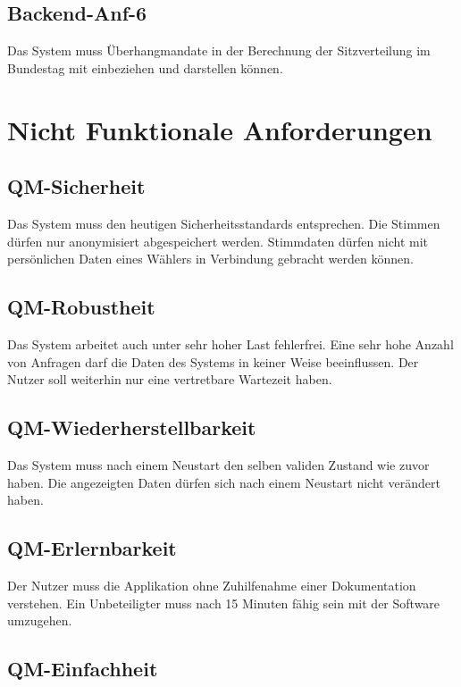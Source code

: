 \documentclass[a4paper]{scrreprt}
\begin{document}
\subsection{Backend-Anf-6}

Das System muss Überhangmandate in der Berechnung der Sitzverteilung im Bundestag mit einbeziehen und darstellen können.

\section{Nicht Funktionale Anforderungen}

\subsection{QM-Sicherheit}

Das System muss den heutigen Sicherheitsstandards entsprechen. Die Stimmen dürfen nur anonymisiert abgespeichert werden. Stimmdaten dürfen nicht mit persönlichen Daten eines Wählers in Verbindung gebracht werden können.

\subsection{QM-Robustheit}

Das System arbeitet auch unter sehr hoher Last fehlerfrei. Eine sehr hohe Anzahl von Anfragen darf die Daten des Systems in keiner Weise beeinflussen. Der Nutzer soll weiterhin nur eine vertretbare Wartezeit haben.

\subsection{QM-Wiederherstellbarkeit}

Das System muss nach einem Neustart den selben validen Zustand wie zuvor haben. Die angezeigten Daten dürfen sich nach einem Neustart nicht verändert haben.

\subsection{QM-Erlernbarkeit}

Der Nutzer muss die Applikation ohne Zuhilfenahme einer Dokumentation verstehen. Ein Unbeteiligter muss nach 15 Minuten fähig sein mit der Software umzugehen.

\subsection{QM-Einfachheit}
\end{document}
